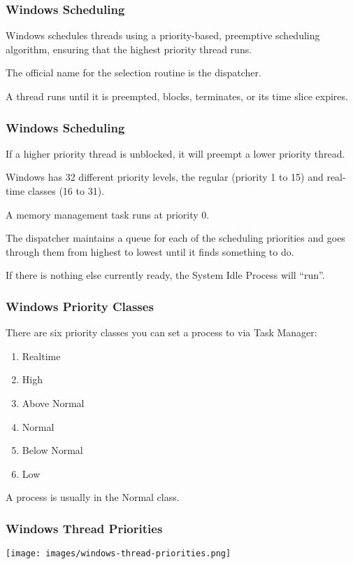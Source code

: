 \begin{frame}
\frametitle{Windows Scheduling}

Windows schedules threads using a priority-based, preemptive scheduling algorithm, ensuring that the highest priority thread runs. 

The official name for the selection routine is the \alert{dispatcher}.

A thread runs until it is preempted, blocks, terminates, or its time slice expires. 

\end{frame}

\begin{frame}
\frametitle{Windows Scheduling}

If a higher priority thread is unblocked, it will preempt a lower priority thread. 

Windows has 32 different priority levels, the regular (priority 1 to 15) and real-time classes (16 to 31). 

A memory management task runs at priority 0.

The dispatcher maintains a queue for each of the scheduling priorities and goes through them from highest to lowest until it finds something to do.

If there is nothing else currently ready, the System Idle Process will ``run''.

\end{frame}

\begin{frame}
\frametitle{Windows Priority Classes}

There are six priority classes you can set a process to via Task Manager:

\begin{enumerate}
	\item Realtime
	\item High
	\item Above Normal
	\item Normal
	\item Below Normal
	\item Low
\end{enumerate}

A process is usually in the Normal class.

\end{frame}

\begin{frame}
\frametitle{Windows Thread Priorities}

\begin{center}
	\texttt{[image: images/windows-thread-priorities.png]}
\end{center}

\end{frame}

